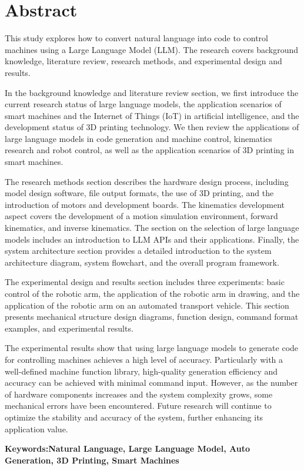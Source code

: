 \documentclass[class=NCU_thesis, crop=false]{standalone}
\begin{document}
\chapter{Abstract}

This study explores how to convert natural language into code to control machines using a Large Language Model (LLM). The research covers background knowledge, literature review, research methods, and experimental design and results.

In the background knowledge and literature review section, we first introduce the current research status of large language models, the application scenarios of smart machines and the Internet of Things (IoT) in artificial intelligence, and the development status of 3D printing technology. We then review the applications of large language models in code generation and machine control, kinematics research and robot control, as well as the application scenarios of 3D printing in smart machines.

The research methods section describes the hardware design process, including model design software, file output formats, the use of 3D printing, and the introduction of motors and development boards. The kinematics development aspect covers the development of a motion simulation environment, forward kinematics, and inverse kinematics. The section on the selection of large language models includes an introduction to LLM APIs and their applications. Finally, the system architecture section provides a detailed introduction to the system architecture diagram, system flowchart, and the overall program framework.

The experimental design and results section includes three experiments: basic control of the robotic arm, the application of the robotic arm in drawing, and the application of the robotic arm on an automated transport vehicle. This section presents mechanical structure design diagrams, function design, command format examples, and experimental results.

The experimental results show that using large language models to generate code for controlling machines achieves a high level of accuracy. Particularly with a well-defined machine function library, high-quality generation efficiency and accuracy can be achieved with minimal command input. However, as the number of hardware components increases and the system complexity grows, some mechanical errors have been encountered. Future research will continue to optimize the stability and accuracy of the system, further enhancing its application value.

\vspace{2em}
\noindent \textbf{Keywords:Natural Language, Large Language Model, Auto Generation, 3D Printing, Smart Machines} \keywordsEn{} %
\end{document}
